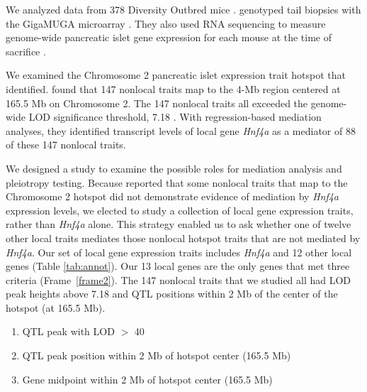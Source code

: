 \documentclass[oneside]{book}\usepackage[]{graphicx}\usepackage[]{color}
\newenvironment{frameenv}[1]
    {\begin{myfloat}[tb]
    \begin{mdframed}[roundcorner=10pt,backgroundcolor=blue!10]
    \caption{#1}
    }
    {%
    \end{mdframed}\end{myfloat}
    }
\begin{document}

We analyzed data from 378 Diversity Outbred mice \citep{keller2018genetic}. 
\citet{keller2018genetic} genotyped tail biopsies with the GigaMUGA microarray \citep{morgan2015mouse}. 
They also used RNA sequencing to measure genome-wide pancreatic islet gene expression 
for each mouse at the time of sacrifice \citep{keller2018genetic}. 

We examined the Chromosome 2 pancreatic islet expression trait hotspot that \citet{keller2018genetic} identified. 
\citet{keller2018genetic} found that 147 nonlocal traits map to the 4-Mb region 
centered at 165.5 Mb on Chromosome 2.
The 147 nonlocal traits all exceeded the genome-wide LOD significance threshold, 
7.18 \citep{keller2018genetic}. 
With regression-based mediation analyses, they identified transcript levels of local gene \emph{Hnf4a} as a mediator of 88 of these 147 nonlocal traits.

We designed a study to examine the possible roles for mediation analysis and pleiotropy testing. 
Because \citet{keller2018genetic} reported that some nonlocal traits that map to 
the Chromosome 2 hotspot did not demonstrate evidence of mediation by \emph{Hnf4a} expression
levels, we elected to study a collection of local gene expression traits, 
rather than \emph{Hnf4a} alone.
This strategy enabled us to ask whether one of twelve other local traits mediates those 
nonlocal hotspot traits that are not mediated by \emph{Hnf4a}. 
Our set of local gene expression traits includes \emph{Hnf4a} and 12 
other local genes (Table \ref{tab:annot}). 
Our 13 local genes are the only genes that met three criteria (Frame~\ref{frame2}).
The 147 nonlocal traits that we studied all had LOD peak heights above 7.18 and QTL positions within 2 Mb of the center of the hotspot (at 165.5 Mb).



\begin{frameenv}{Local gene inclusion criteria}\label{frame2}
\begin{enumerate}
    \item QTL peak with LOD $>$ 40
    \item QTL peak position within 2 Mb of hotspot center (165.5 Mb)
    \item Gene midpoint within 2 Mb of hotspot center (165.5 Mb)
\end{enumerate}
\end{frameenv}
\end{document}

